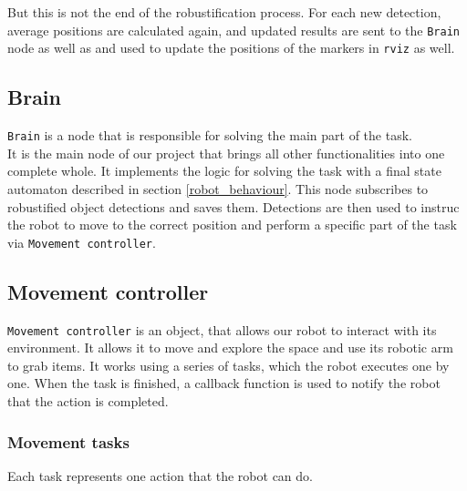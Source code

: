 \documentclass[12pt,a4paper]{article}
\begin{document}
	But this is not the end of the robustification process. For each new detection, average positions are calculated again, and updated results are sent to the \texttt{Brain} node as well as and used to update the positions of the markers in \texttt{rviz} as well. \\
	
	\subsection{Brain}
	\texttt{Brain} is a node that is responsible for solving the main part of the task. \\
	
	It is the main node of our project that brings all other functionalities into one complete whole. It implements the logic for solving the task with a final state automaton described in section \ref{robot_behaviour}. This node subscribes to robustified object detections and saves them. Detections are then used to instruc the robot to move to the correct position and perform a specific part of the task via \texttt{Movement controller}. \\
	
	\subsection{Movement controller}
	\texttt{Movement controller} is an object, that allows our robot to interact with its environment. It allows it to move and explore the space and use its robotic arm to grab items. It works using a series of tasks, which the robot executes one by one. When the task is finished, a callback function is used to notify the robot that the action is completed. \\

	\subsubsection{Movement tasks}
	Each task represents one action that the robot can do.
\end{document}
